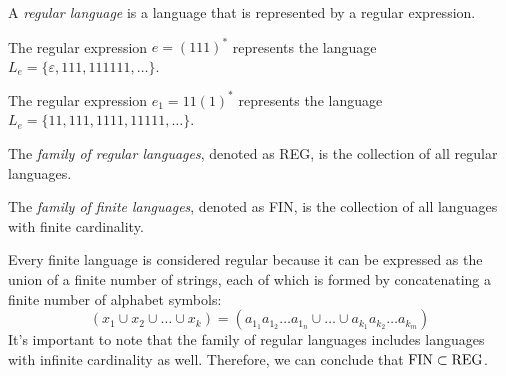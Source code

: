 \begin{definition}
    A \emph{regular language} is a language that is represented by a regular expression.
\end{definition}
\begin{example}
    The regular expression $e=(111)^{*}$ represents the language $L_e=\{\varepsilon,111,111111,\dots\}$. 

    The regular expression $e_1=11(1)^{*}$ represents the language $L_e=\{11,111,1111,11111,\dots\}$. 
\end{example}
\begin{definition}
    The \emph{family of regular languages}, denoted as REG, is the collection of all regular languages. 

    The \emph{family of finite languages}, denoted as FIN, is the collection of all languages with finite cardinality.
\end{definition}
Every finite language is considered regular because it can be expressed as the union of a finite number of strings, each of which is formed by concatenating a finite number of alphabet symbols: 
\[\left(x_1 \cup x_2 \cup \dots \cup x_k \right) = \left( a_{1_1}a_{1_2}\dots a_{1_n} \cup \dots \cup a_{k_1}a_{k_2}\dots a_{k_m} \right)\]
It's important to note that the family of regular languages includes languages with infinite cardinality as well.
Therefore, we can conclude that $\textnormal{FIN} \subset \textnormal{REG}$.

